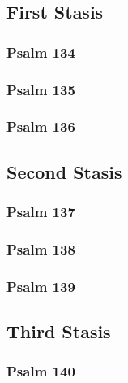 \documentclass[12pt]{book}
\newcommand{\kathismabreak}{
  \medskip
  \begin{center}
  \begin{footnotesize}
  

  

  

  
  \end{footnotesize}
  \end{center}
  \smallbreak
}
\begin{document}
\subsection{First Stasis}

\subsubsection{Psalm 134}


\subsubsection{Psalm 135}


\subsubsection{Psalm 136}


\kathismabreak

\pagebreak %
\subsection{Second Stasis}

\subsubsection{Psalm 137}


\subsubsection{Psalm 138}


\newpage %
\subsubsection{Psalm 139}


\kathismabreak

\subsection{Third Stasis}

\subsubsection{Psalm 140}

\end{document}
